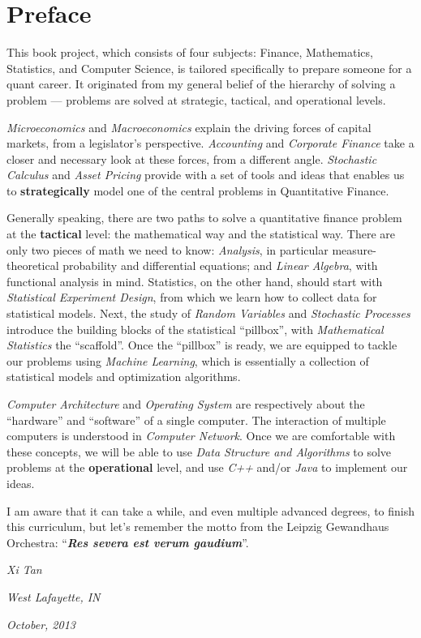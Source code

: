 \chapter*{Preface}
This book project, which consists of four subjects: Finance, Mathematics, Statistics, and Computer Science, is tailored specifically to prepare someone for a quant career. It originated from my general belief of the hierarchy of solving a problem --- problems are solved at strategic, tactical, and operational levels.

{\em{Microeconomics}} and {\em{Macroeconomics}} explain the driving forces of capital markets, from a legislator's perspective. {\em{Accounting}} and {\em{Corporate Finance}} take a closer and necessary look at these forces, from a different angle. {\em{Stochastic Calculus}} and {\em{Asset Pricing}} provide with a set of tools and ideas that enables us to {\bf{strategically}} model one of the central problems in Quantitative Finance.

Generally speaking, there are two paths to solve a quantitative finance problem at the {\bf{tactical}} level: the mathematical way and the statistical way. There are only two pieces of math we need to know: {\em{Analysis}}, in particular measure-theoretical probability and differential equations; and {\em{Linear Algebra}}, with functional analysis in mind. Statistics, on the other hand, should start with {\em{Statistical Experiment Design}}, from which we learn how to collect data for statistical models. Next, the study of {\em{Random Variables}} and {\em{Stochastic Processes}} introduce the building blocks of the statistical ``pillbox'', with {\em{Mathematical Statistics}} the ``scaffold''. Once the ``pillbox'' is ready, we are equipped to tackle our problems using {\em{Machine Learning}}, which is essentially a collection of statistical models and optimization algorithms.

{\em{Computer Architecture}} and {\em{Operating System}} are respectively about the ``hardware'' and ``software'' of a single computer. The interaction of multiple computers is understood in {\em{Computer Network}}. Once we are comfortable with these concepts, we will be able to use {\em{Data Structure and Algorithms}} to solve problems at the {\bf{operational}} level, and use {\em{C++}} and/or {\em{Java}} to implement our ideas.

I am aware that it can take a while, and even multiple advanced degrees, to finish this curriculum, but let's remember the motto from the Leipzig Gewandhaus Orchestra: ``{\bf{\em{Res severa est verum gaudium}}}''.

\vspace{8mm}
\hfill {\em{Xi Tan}}

\hfill {\em{West Lafayette, IN}}

\hfill {\em{October, 2013}}